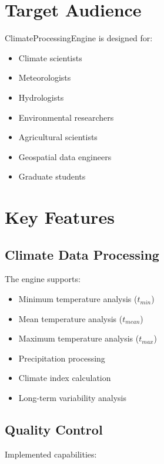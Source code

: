 \documentclass[11pt,a4paper]{article}
\begin{document}
\section{Target Audience}


ClimateProcessingEngine is designed for:

\begin{itemize}

\item Climate scientists
\item Meteorologists
\item Hydrologists
\item Environmental researchers
\item Agricultural scientists
\item Geospatial data engineers
\item Graduate students

\end{itemize}



\section{Key Features}


\subsection{Climate Data Processing}


The engine supports:


\begin{itemize}

\item Minimum temperature analysis ($t_{min}$)
\item Mean temperature analysis ($t_{mean}$)
\item Maximum temperature analysis ($t_{max}$)
\item Precipitation processing
\item Climate index calculation
\item Long-term variability analysis

\end{itemize}



\subsection{Quality Control}


Implemented capabilities:
\end{document}
